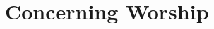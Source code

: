 \documentclass[../main.tex]{subfiles}
\begin{document}
	
	\chapter{Concerning Worship}
	
	
	
	\theendnotes
	\setcounter{endnote}{0}
\end{document}
